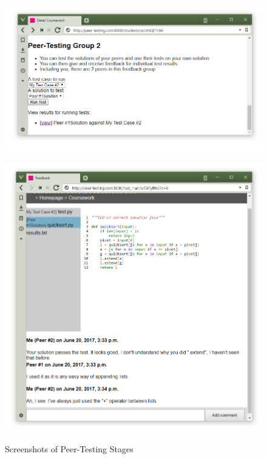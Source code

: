 \documentclass[sigplan,10pt,review]{acmart}\settopmatter{printfolios=true}
\begin{document}
\begin{figure}
\begin{minipage}{.45\linewidth}
\begin{minipage}[b]{1\linewidth}
  \centering
  \includegraphics[width=1\linewidth]{screenshot-stage2-1}
  \label{fig:stage-2-1}
\end{minipage}%

\begin{minipage}[t]{1\linewidth}
  \centering
  \includegraphics[width=1\linewidth]{screenshot-stage2-2}
  \label{fig:stage-2-2}
\end{minipage}%
  \end{minipage}
%
%
\caption{Screenshots of Peer-Testing Stages}\label{fig:stages}
\end{figure}
\end{document}
